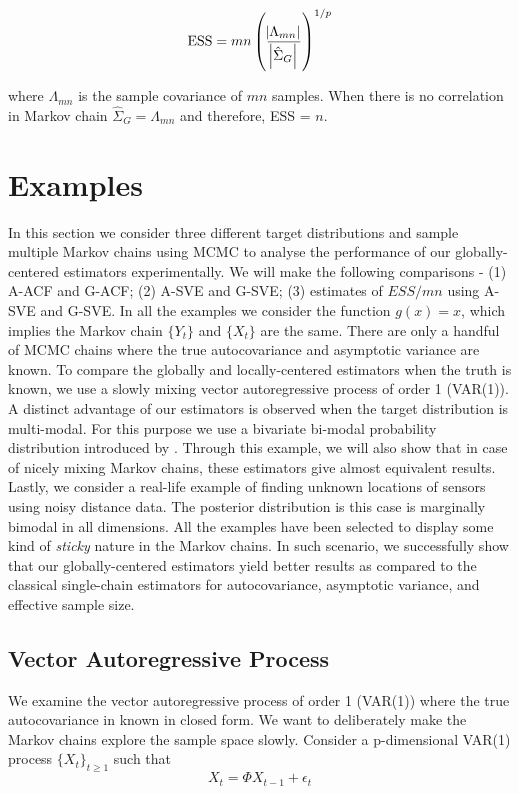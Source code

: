 \documentclass[11pt]{article}
\theoremstyle{remark}
\begin{document}
\[
\text{ESS} = mn\left(\dfrac{\abs{\Lambda_{mn}}}{\abs{\hat{\Sigma}_{G}}}\right)^{1/p}
\]

where $\Lambda_{mn}$ is the sample covariance of $mn$ samples. When there is no correlation in Markov chain $\hat{\Sigma}_{G} = \Lambda_{mn}$ and therefore, ESS = $n$. 

\section{Examples} \label{sec:examples}

In this section we consider three different target distributions and sample multiple Markov chains using MCMC to analyse the performance of our globally-centered estimators experimentally. We will make the following comparisons - (1) A-ACF and G-ACF; (2) A-SVE and G-SVE; (3) estimates of $ESS/mn$ using A-SVE and G-SVE. In all the examples we consider the function $g(x) = x$, which implies the Markov chain $\{Y_t\}$ and $\{X_t\}$ are the same. There are only a handful of MCMC chains where the true autocovariance and asymptotic variance are known. To compare the globally and locally-centered estimators when the truth is known, we use a slowly mixing vector autoregressive process of order 1 (VAR(1)). A distinct advantage of our estimators is observed when the target distribution is multi-modal. For this purpose we use a bivariate bi-modal probability distribution introduced by \cite{gelman1991note}. Through this example, we will also show that in case of nicely mixing Markov chains, these estimators give almost equivalent results. Lastly, we consider a real-life example of finding unknown locations of sensors using noisy distance data. The posterior distribution is this case is marginally bimodal in all dimensions. All the examples have been selected to display some kind of \textit{sticky} nature in the Markov chains. In such scenario, we successfully show that our globally-centered estimators yield better results as compared to the classical single-chain estimators for autocovariance, asymptotic variance, and effective sample size.


\subsection{Vector Autoregressive Process} \label{ex:var}

We examine the vector autoregressive process of order 1 (VAR(1)) where the true autocovariance in known in closed form. We want to deliberately make the Markov chains explore the sample space slowly. Consider a p-dimensional VAR(1) process $\{X_t\}_{t \geq 1}$ such that
%
\[
X_t = \Phi X_{t-1} + \epsilon_t
\]
\end{document}
